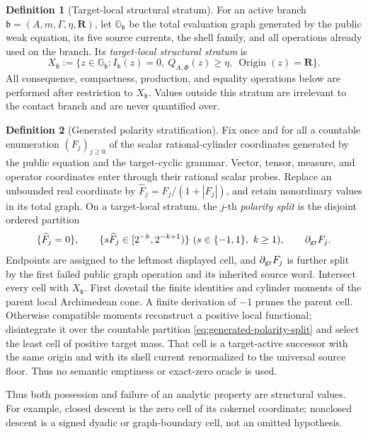 \documentclass[11pt]{article}
\numberwithin{section}{part}
\theoremstyle{plain}
\theoremstyle{definition}
\newtheorem{definition}[definition]{Definition}
\theoremstyle{remark}
\begin{document}
\begin{definition}[Target-local structural stratum]
\label{def:target-local-structural-stratum}
For an active branch \(\mathfrak b=(A,m,\Gamma,\eta,\mathbf R)\), let
\(\mathbb G_{\mathfrak b}\) be the total evaluation graph generated by the
public weak equation, its five source currents, the shell family, and all
operations already used on the branch.  Its \emph{target-local structural
stratum} is
\begin{equation}
 \label{eq:target-local-structural-stratum}
 X_{\mathfrak b}:=
 \{z\in\mathbb G_{\mathfrak b}:I_{\mathfrak b}(z)=0,
       \ Q_{A,\Phi}(z)\ge\eta,\
       \operatorname{Origin}(z)=\mathbf R\}.
\end{equation}
All consequence, compactness, production, and equality operations below are
performed after restriction to \(X_{\mathfrak b}\).  Values outside this
stratum are irrelevant to the contact branch and are never quantified over.
\end{definition}

\begin{definition}[Generated polarity stratification]
\label{def:generated-polarity-stratification}
Fix once and for all a countable enumeration
\((F_j)_{j\ge0}\) of the scalar rational-cylinder coordinates generated by
the public equation and the target-cyclic grammar.  Vector, tensor, measure,
and operator coordinates enter through their rational scalar probes.  Replace
an unbounded real coordinate by
\(\widehat F_j=F_j/(1+|F_j|)\), and retain nonordinary values in its total
graph.  On a target-local stratum, the \(j\)-th \emph{polarity split} is the
disjoint ordered partition
\begin{equation}
 \label{eq:generated-polarity-split}
 \{\widehat F_j=0\},\qquad
 \{s\widehat F_j\in[2^{-k},2^{-k+1})\}
 \ (s\in\{-1,1\},\ k\ge1),\qquad
 \partial_{\rm gr}F_j .
\end{equation}
Endpoints are assigned to the leftmost displayed cell, and
\(\partial_{\rm gr}F_j\) is further split by the first failed public graph
operation and its inherited source word.  Intersect every cell with
\(X_{\mathfrak b}\).  First dovetail the finite identities and cylinder
moments of the parent local Archimedean cone.  A finite derivation of \(-1\)
prunes the parent cell.  Otherwise compatible moments reconstruct a positive
local functional; disintegrate it over the countable partition
\eqref{eq:generated-polarity-split} and select the least cell of positive
target mass.  That cell is a target-active successor with the same origin and
with its shell current renormalized to the universal source floor.  Thus no
semantic emptiness or exact-zero oracle is used.

Thus both possession and failure of an analytic property are structural
values.  For example, closed descent is the zero cell of its cokernel
coordinate; nonclosed descent is a signed dyadic or graph-boundary cell, not
an omitted hypothesis.
\end{definition}
\end{document}
